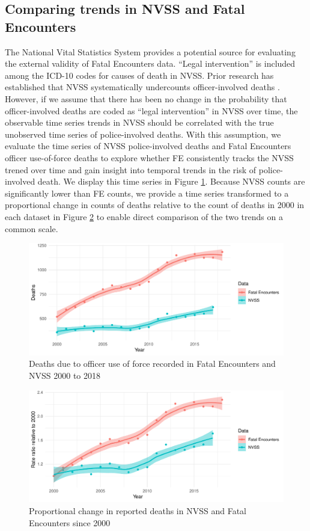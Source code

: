 \documentclass[9pt,twoside,lineno]{pnas-new}
\begin{document}
\subsection*{Comparing trends in NVSS and Fatal Encounters}

The National Vital Statistics System provides a potential source for evaluating the external validity of Fatal Encounters data. ``Legal intervention'' is included among the ICD-10 codes for causes of death in NVSS. Prior research has established that NVSS systematically undercounts officer-involved deaths \cite{Feldman2017Quantifying}. However, if we assume that there has been no change in the probability that officer-involved deaths are coded as ``legal intervention'' in NVSS over time, the observable time series trends in NVSS should be correlated with the true unobserved time series of police-involved deaths. With this assumption, we evaluate the time series of NVSS police-involved deaths and Fatal Encounters officer use-of-force deaths to explore whether FE consistently tracks the NVSS trened over time and gain insight into temporal trends in the risk of police-involved death. We display this time series in Figure \ref{fig:countTS}. Because NVSS counts are significantly lower than FE counts, we provide a time series transformed to a proportional change in counts of deaths relative to the count of deaths in 2000 in each dataset in Figure \ref{fig:pctTS} to enable direct comparison of the two trends on a common scale. 

\begin{figure}
	\centering
	\includegraphics[width = \linewidth]{vis/nvss_fe_ts.pdf}
	\caption{Deaths due to officer use of force recorded in Fatal Encounters and NVSS 2000 to 2018}
	\label{fig:countTS}
\end{figure}

\begin{figure}
	\centering
	\includegraphics[width = \linewidth]{vis/nvss_fe_pct.pdf}
	\caption{Proportional change in reported deaths in NVSS and Fatal Encounters since 2000}
	\label{fig:pctTS}
\end{figure}
\end{document}
